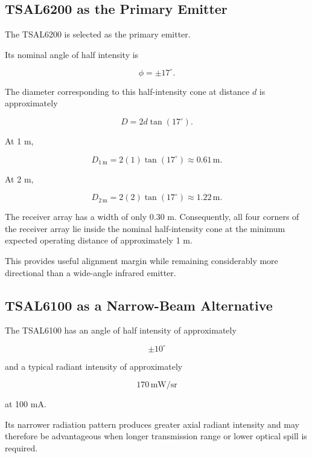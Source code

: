 \documentclass[a4paper,12pt]{article}
\begin{document}

\subsection{TSAL6200 as the Primary Emitter}

The TSAL6200 is selected as the primary emitter.

Its nominal angle of half intensity is

\[
\phi = \pm17^\circ.
\]

The diameter corresponding to this half-intensity cone at distance
\(d\) is approximately

\[
D =
2d\tan(17^\circ).
\]

At 1 m,

\[
D_{1\,\text{m}}
=
2(1)\tan(17^\circ)
\approx
0.61\,\text{m}.
\]

At 2 m,

\[
D_{2\,\text{m}}
=
2(2)\tan(17^\circ)
\approx
1.22\,\text{m}.
\]

The receiver array has a width of only 0.30 m.
Consequently, all four corners of the receiver array lie inside the
nominal half-intensity cone at the minimum expected operating distance
of approximately 1 m.

This provides useful alignment margin while remaining considerably
more directional than a wide-angle infrared emitter.



\subsection{TSAL6100 as a Narrow-Beam Alternative}

The TSAL6100 has an angle of half intensity of approximately

\[
\pm10^\circ
\]

and a typical radiant intensity of approximately

\[
170\,\text{mW/sr}
\]

at 100 mA.

Its narrower radiation pattern produces greater axial radiant intensity
and may therefore be advantageous when longer transmission range or
lower optical spill is required.
\end{document}
